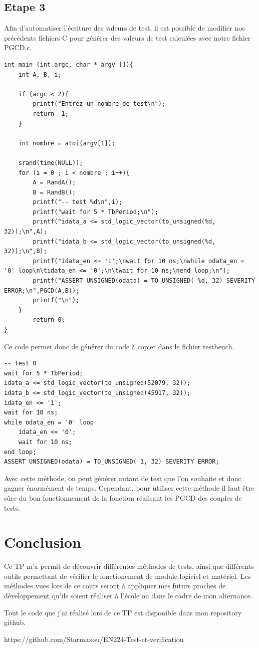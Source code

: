 \documentclass[a4paper]{article}
\begin{document}
    \subsection{Etape 3}
        Afin d'automatiser l'écriture des valeurs de test, il est possible de modifier nos précédents fichiers C pour générer des valeurs de test calculées avec notre fichier PGCD.c.
\begin{lstlisting}[style=CStyle]
int main (int argc, char * argv []){
    int A, B, i;

    if (argc < 2){
        printf("Entrez un nombre de test\n");
        return -1;
    }

    int nombre = atoi(argv[1]);

    srand(time(NULL));
    for (i = 0 ; i < nombre ; i++){
        A = RandA();
        B = RandB();
        printf("-- test %d\n",i);
        printf("wait for 5 * TbPeriod;\n");
        printf("idata_a <= std_logic_vector(to_unsigned(%d, 32));\n",A);
        printf("idata_b <= std_logic_vector(to_unsigned(%d, 32));\n",B);
        printf("idata_en <= '1';\nwait for 10 ns;\nwhile odata_en = '0' loop\n\tidata_en <= '0';\n\twait for 10 ns;\nend loop;\n");
        printf("ASSERT UNSIGNED(odata) = TO_UNSIGNED( %d, 32) SEVERITY ERROR;\n",PGCD(A,B));
        printf("\n");
    }
        return 0;
}
\end{lstlisting}
        Ce code permet donc de générer du code à copier dans le fichier testbench.
\begin{lstlisting}[style=VHDL]
-- test 0
wait for 5 * TbPeriod;
idata_a <= std_logic_vector(to_unsigned(52079, 32));
idata_b <= std_logic_vector(to_unsigned(45917, 32));
idata_en <= '1';
wait for 10 ns;
while odata_en = '0' loop
    idata_en <= '0';
    wait for 10 ns;
end loop;
ASSERT UNSIGNED(odata) = TO_UNSIGNED( 1, 32) SEVERITY ERROR;
\end{lstlisting}
        Avec cette méthode, on peut générer autant de test que l'on souhaite et donc gagner énormément de temps.
        Cependant, pour utiliser cette méthode il faut être sûre du bon fonctionnement de la fonction réalisant les PGCD des couples de tests.

\section{Conclusion} %
    Ce TP m'a permit de découvrir différentes méthodes de tests, ainsi que différents outils permettant de vérifier le fonctionement de module logiciel et matériel.
    Les méthodes vues lors de ce cours seront à appliquer mes futurs proches de développement qu'ils soient réaliser à l'école ou dans le cadre de mon alternance.

    Tout le code que j'ai réalisé lors de ce TP est disponible dans mon repository github.
    
    https://github.com/Starmaxou/EN224-Test-et-verification

\newpage %
\listoftodos
\end{document}
